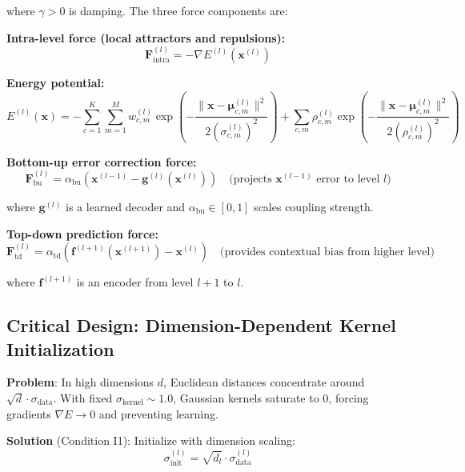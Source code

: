 \documentclass[11pt,a4paper]{article}
\begin{document}
where $\gamma > 0$ is damping. The three force components are:

\textbf{Intra-level force (local attractors and repulsions):}
\begin{equation}
\mathbf{F}^{(l)}_{\text{intra}} = -\nabla E^{(l)}(\mathbf{x}^{(l)})
\end{equation}

\textbf{Energy potential:}
\begin{equation}
E^{(l)}(\mathbf{x}) = -\sum_{c=1}^{K} \sum_{m=1}^{M} w_{c,m}^{(l)} \exp\left(-\frac{\|\mathbf{x} - \boldsymbol{\mu}_{c,m}^{(l)}\|^2}{2(\sigma_{c,m}^{(l)})^2}\right) 
  + \sum_{c,m} \rho_{c,m}^{(l)} \exp\left(-\frac{\|\mathbf{x} - \boldsymbol{\mu}_{c,m}^{(l)}\|^2}{2(\rho_{c,m}^{(l)})^2}\right)
\label{eq:energy}
\end{equation}

\textbf{Bottom-up error correction force:}
\begin{equation}
\mathbf{F}^{(l)}_{\text{bu}} = \alpha_{\text{bu}} \left(\mathbf{x}^{(l-1)} - \mathbf{g}^{(l)}(\mathbf{x}^{(l)})\right) \quad \text{(projects $\mathbf{x}^{(l-1)}$ error to level $l$)}
\end{equation}

where $\mathbf{g}^{(l)}$ is a learned decoder and $\alpha_{\text{bu}} \in [0, 1]$ scales coupling strength.

\textbf{Top-down prediction force:}
\begin{equation}
\mathbf{F}^{(l)}_{\text{td}} = \alpha_{\text{td}} \left(\mathbf{f}^{(l+1)}(\mathbf{x}^{(l+1)}) - \mathbf{x}^{(l)}\right) \quad \text{(provides contextual bias from higher level)}
\end{equation}

where $\mathbf{f}^{(l+1)}$ is an encoder from level $l+1$ to $l$.

\subsection{Critical Design: Dimension-Dependent Kernel Initialization}

\textbf{Problem}: In high dimensions $d$, Euclidean distances concentrate around $\sqrt{d} \cdot \sigma_{\text{data}}$. With fixed $\sigma_{\text{kernel}} \sim 1.0$, Gaussian kernels saturate to 0, forcing gradients $\nabla E \to 0$ and preventing learning.

\textbf{Solution} (Condition I1): Initialize with dimension scaling:
\begin{equation}
\sigma^{(l)}_{\text{init}} = \sqrt{d_l} \cdot \sigma_{\text{data}}^{(l)}
\end{equation}
\end{document}

